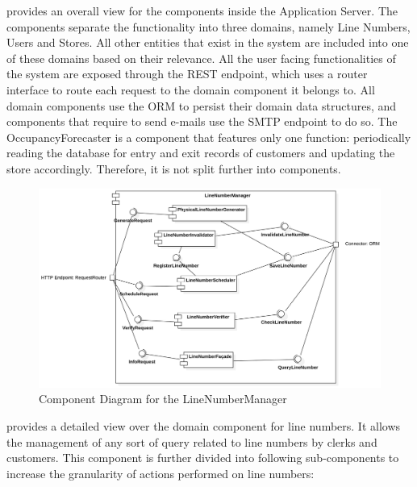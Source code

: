  provides an overall view for the components inside the Application Server.
The components separate the functionality into three domains, namely Line Numbers, Users and Stores.
All other entities that exist in the system are included into one of these domains based on their relevance.
All the user facing functionalities of the system are exposed through the REST endpoint, which uses a router interface to route each request to the domain component it belongs to.
All domain components use the ORM to persist their domain data structures, and components that require to send e-mails use the SMTP endpoint to do so.
The OccupancyForecaster is a component that features only one function: periodically reading the database for entry and exit records of customers and updating the store accordingly.
Therefore, it is not split further into components.
\begin{figure}[H]
    \centering
    \includegraphics[height=0.4\textwidth]{Images/ComponentDiagrams/LineNumberManager.png}
    \caption{Component Diagram for the LineNumberManager}
    \label{fig:CDLineNumberManager}
\end{figure}
 provides a detailed view over the domain component for line numbers.
It allows the management of any sort of query related to line numbers by clerks and customers.
This component is further divided into following sub-components to increase the granularity of actions performed on line numbers:
